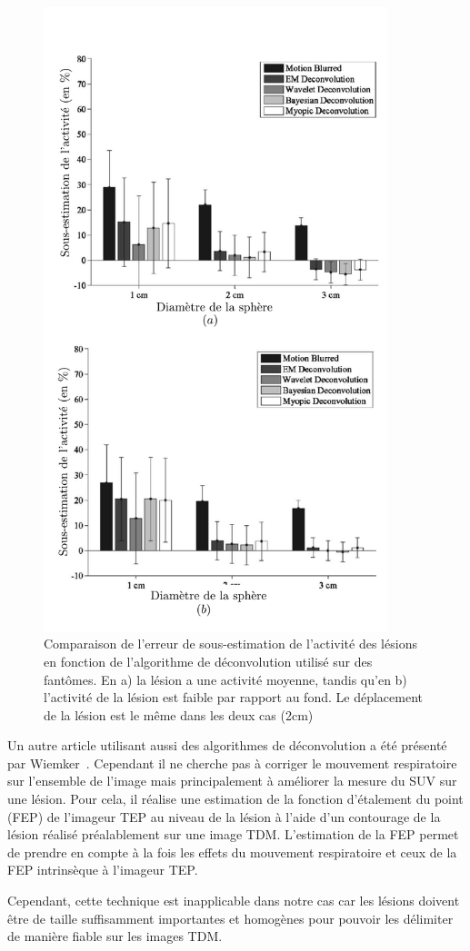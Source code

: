 \begin{figure}[h!]
	\begin{center}
		\includegraphics[width=10cm]{images/performanceDeconvolution}
	\end{center}
	\caption{Comparaison de l'erreur de sous-estimation de l'activité des lésions en fonction de l'algorithme de déconvolution utilisé sur des fantômes. En a) la lésion a une activité moyenne, tandis qu'en b) l'activité de la lésion est faible par rapport au fond. Le déplacement de la lésion est le même dans les deux cas (2cm)} 
	\label{fig:performanceDeconvolution}
\end{figure}


Un autre article utilisant aussi des algorithmes de déconvolution a été présenté par Wiemker~\cite{wiemker2008combined}. Cependant il ne cherche pas à corriger le mouvement respiratoire sur l'ensemble de l'image mais principalement à améliorer la mesure du SUV sur une lésion. Pour cela, il réalise une estimation de la fonction d'étalement du point (FEP) de l'imageur TEP au niveau de la lésion à l'aide d'un contourage de la lésion réalisé préalablement sur une image TDM. L'estimation de la FEP permet de prendre en compte à la fois les effets du mouvement respiratoire et ceux de la FEP intrinsèque à l'imageur TEP. 

Cependant, cette technique est inapplicable dans notre cas car les lésions doivent être de taille suffisamment importantes et homogènes pour pouvoir les délimiter de manière fiable sur les images TDM.

